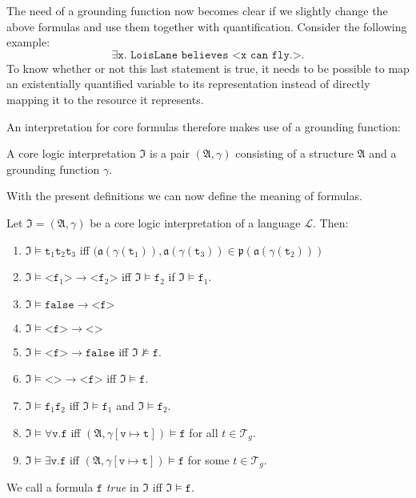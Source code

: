 The need of a grounding function now becomes clear if we slightly change the above formulas and use them together with quantification. Consider the following example:
\[
 \exists\texttt{x. LoisLane believes <x can fly.>.}
\]
To know whether or not this last statement is true, it needs to be possible to map an existentially quantified variable to its representation instead of directly mapping it to the resource 
it represents.


An interpretation for core formulas therefore makes use of a grounding function:


\begin{definition}
A core logic interpretation $\mathfrak{I}$ is a pair $(\mathfrak{A}, \gamma)$ consisting of a structure $\mathfrak{A}$ and a grounding function $\gamma$.
\end{definition}


With the present definitions we can now define the meaning  of formulas. 


\begin{definition}
Let $\mathfrak{I}=(\mathfrak{A}, \gamma)$ be a core logic interpretation of a language $\mathcal{L}$. %
Then:
 \begin{enumerate}
 \item $\mathfrak{I}\models \texttt{t}_1\texttt{t}_2 \texttt{t}_3$ iff 
 $(\mathfrak{a}(\gamma(\texttt{t}_1)), \mathfrak{a}(\gamma(\texttt{t}_3))\in \mathfrak{p}(\mathfrak{a}(\gamma(\texttt{t}_2)))$
   \item $\mathfrak{I}\models \texttt{<f}_1\texttt{>}\rightarrow \texttt{<f}_2\texttt{>}$ iff 
  $\mathfrak{I}\models \texttt{f}_2$ if $\mathfrak{I}\models \texttt{f}_1$.
  \item $\mathfrak{I}\models \texttt{false} \rightarrow \texttt{<f>}$
  \item $\mathfrak{I}\models \texttt{<f>}\rightarrow \texttt{<>}$
  \item $\mathfrak{I}\models \texttt{<f>} \rightarrow \texttt{false}$ iff $\mathfrak{I}\not \models \texttt{f}$.
  \item $\mathfrak{I}\models \texttt{<>} \rightarrow \texttt{<f>}$ iff $\mathfrak{I}\models \texttt{f}$.
  \item $\mathfrak{I}\models \texttt{f}_1\texttt{f}_2$ iff $\mathfrak{I}\models \texttt{f}_1$ and $\mathfrak{I}\models \texttt{f}_2$.
  \item $\mathfrak{I}\models \forall \texttt{v.f}$ iff $(\mathfrak{A}, \gamma[\texttt{v}\mapsto\texttt{t}])\models\texttt{f}$ for all $t\in \mathcal{T}_g$.
  \item $\mathfrak{I}\models \exists \texttt{v.f}$ iff $(\mathfrak{A}, \gamma[\texttt{v}\mapsto\texttt{t}])\models \texttt{f}$ for some $t\in \mathcal{T}_g$.
 \end{enumerate}
%
We call a formula $\texttt{f}$ \emph{true} in $\mathfrak{I}$ iff $\mathfrak{I}\models \texttt{f}$. 
\end{definition}


